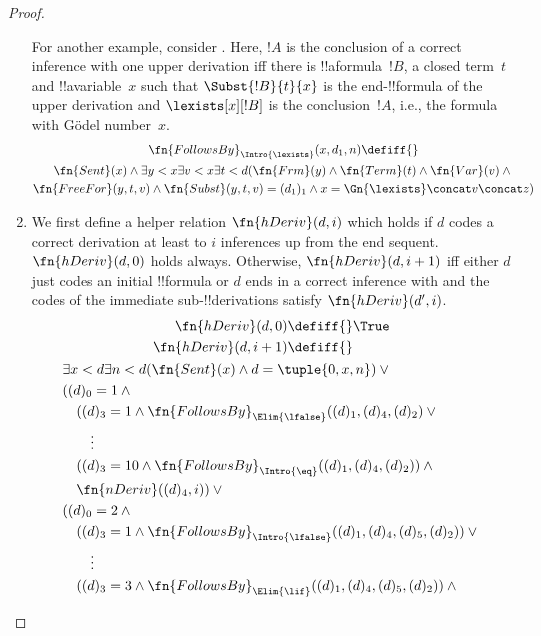 \documentclass[../../../include/open-logic-section]{subfiles}
\begin{document}
\begin{proof}
\begin{enumerate}
  For another example, consider \Intro{\lexists}.  Here, $!A$ is the
  conclusion of a correct inference with one upper derivation iff
  there is !!a{formula}~$!B$, a closed term~$t$ and
  !!a{variable}~$x$ such that $\Subst{!B}{t}{x}$ is the
  end-!!{formula} of the upper derivation and $\lexists[x][!B]$
  is the conclusion~$!A$, i.e., the formula with G\"odel number~$x$.
\begin{multline*}
\fn{FollowsBy}_{\Intro{\lexists}}(x, d_1, n) \defiff {} \\
\fn{Sent}(x) \land \exists y < x\exists v<x\exists t<d
(\fn{Frm}(y) \land \fn{Term}(t) \land \fn{Var}(v)  \land {}\\
\fn{FreeFor}(y, t, v) \land \fn{Subst}(y,t,v) = (d_1)_1 \land
x = \Gn{\lexists} \concat v \concat z)
\end{multline*}
\item We first define a helper relation $\fn{hDeriv}(d, i)$ which
  holds if $d$ codes a correct derivation at least to $i$ inferences
  up from the end sequent.  $\fn{hDeriv}(d, 0)$ holds always.
  Otherwise, $\fn{hDeriv}(d, i+1)$ iff either $d$ just codes an
  initial !!{formula} or $d$ ends in a correct inference with
  and the codes of the immediate sub-!!{derivation}s satisfy
  $\fn{hDeriv}(d', i)$.
\begin{multline*}
  \begin{aligned}
\fn{hDeriv}(d, 0) \defiff {} & \True \\
\fn{hDeriv}(d, i+1) \defiff {} &
  \end{aligned}\\
  \begin{aligned}
& \exists x<d\exists n<d(\fn{Sent}(x) \land d = \tuple{0, x, n}) \lor {}\\
& ((d)_0 = 1 \land {}\\
& \quad ((d)_3 = 1 \land
\fn{FollowsBy}_{\Elim{\lfalse}}((d)_1, (d)_4, (d)_2) \lor{}\\
& \qquad \vdots\\
& \quad ((d)_3 = 10 \land
\fn{FollowsBy}_{\Intro{\eq}}((d)_1, (d)_4, (d)_2)) \land {}\\
& \quad \fn{nDeriv}((d)_4, i)) \lor {}\\
& ((d)_0 = 2 \land {}\\
& \quad ((d)_3 = 1 \land 
\fn{FollowsBy}_{\Intro{\lfalse}}((d)_1, (d)_4, (d)_5, (d)_2)) \lor{}\\
& \qquad \vdots\\
& \quad ((d)_3 = 3 \land
\fn{FollowsBy}_{\Elim{\lif}}((d)_1, (d)_4, (d)_5, (d)_2)) \land {}\\

\end{aligned}
\end{multline*}
\end{enumerate}
\end{proof}
\end{document}
